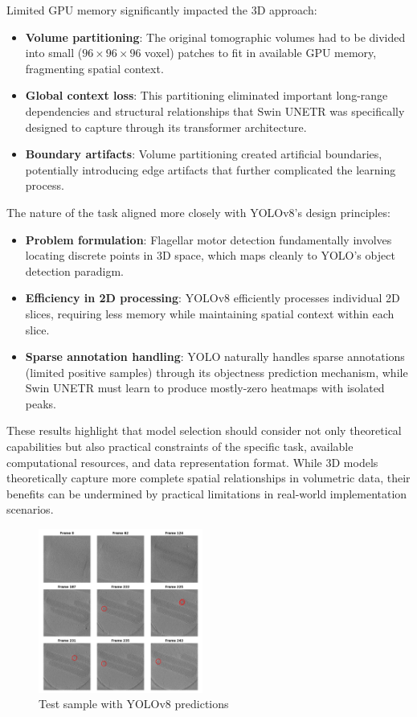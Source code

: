 \documentclass{article}
\begin{document}
Limited GPU memory significantly impacted the 3D approach:

\begin{itemize}
    \item \textbf{Volume partitioning}: The original tomographic volumes had to be divided into small ($96 \times 96 \times 96$ voxel) patches to fit in available GPU memory, fragmenting spatial context.
    \item \textbf{Global context loss}: This partitioning eliminated important long-range dependencies and structural relationships that Swin UNETR was specifically designed to capture through its transformer architecture.
    \item \textbf{Boundary artifacts}: Volume partitioning created artificial boundaries, potentially introducing edge artifacts that further complicated the learning process.
\end{itemize}

The nature of the task aligned more closely with YOLOv8's design principles:

\begin{itemize}
    \item \textbf{Problem formulation}: Flagellar motor detection fundamentally involves locating discrete points in 3D space, which maps cleanly to YOLO's object detection paradigm.
    \item \textbf{Efficiency in 2D processing}: YOLOv8 efficiently processes individual 2D slices, requiring less memory while maintaining spatial context within each slice.
    \item \textbf{Sparse annotation handling}: YOLO naturally handles sparse annotations (limited positive samples) through its objectness prediction mechanism, while Swin UNETR must learn to produce mostly-zero heatmaps with isolated peaks.
\end{itemize}

These results highlight that model selection should consider not only theoretical capabilities but also practical constraints of the specific task, available computational resources, and data representation format. While 3D models theoretically capture more complete spatial relationships in volumetric data, their benefits can be undermined by practical limitations in real-world implementation scenarios.

\begin{figure}[htb]
    \centering
    \includegraphics[width=0.48\textwidth]{images/test_sample.png}
    \caption{Test sample with YOLOv8 predictions}
    \label{fig:test_sample}
\end{figure}
\end{document}
